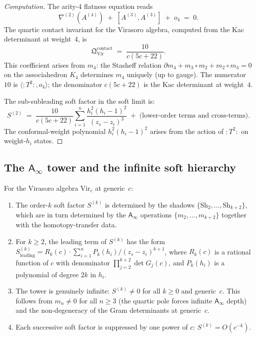 \documentclass[11pt]{article}
\newcommand{\Ainf}{\mathsf{A}_{\infty}}
\begin{document}
\begin{proof}[Computation]
The arity-$4$ flatness equation reads
\[
\nabla^{(2)}(A^{(4)})
\;+\;
[A^{(3)}, A^{(3)}]
\;+\; o_4
\;=\; 0.
\]
The quartic contact invariant for the Virasoro algebra, computed from the Kac determinant at weight~$4$, is
\begin{equation}\label{eq:quartic-from-m4}
\mathfrak{Q}^{\mathrm{contact}}_{\mathrm{Vir}}
\;=\;
\frac{10}{c(5c + 22)}.
\end{equation}
This coefficient arises from $m_4$: the Stasheff relation $\partial m_4 + m_3 \circ m_2 + m_2 \circ m_3 = 0$ on the associahedron $K_4$ determines $m_4$ uniquely (up to gauge).  The numerator~$10$ is $\langle :T^2:, o_4 \rangle$; the denominator $c(5c+22)$ is the Kac determinant at weight~$4$.

The sub-subleading soft factor in the soft limit is:
\begin{equation}\label{eq:sub-subleading-from-m4}
\boxed{
S^{(2)}
\;=\;
\frac{10}{c(5c+22)}
\sum_{i=1}^{n}
\frac{h_i^2(h_i - 1)^2}{(z_s - z_i)^3}
\;+\; \text{(lower-order terms and cross-terms)}.}
\end{equation}
The conformal-weight polynomial $h_i^2(h_i - 1)^2$ arises from the action of $:T^2:$ on weight-$h_i$ states.
\end{proof}

\subsection{The $\Ainf$ tower and the infinite soft hierarchy}

\begin{proposition}[$\Ainf$ tower $\Longleftrightarrow$ soft graviton tower]\label{claim:ainf-soft-tower}
For the Virasoro algebra $\mathrm{Vir}_c$ at generic~$c$:
\begin{enumerate}
\item[(a)] The order-$k$ soft factor $S^{(k)}$ is determined by the shadows $\{\mathrm{Sh}_2, \ldots, \mathrm{Sh}_{k+2}\}$, which are in turn determined by the $\Ainf$ operations $\{m_2, \ldots, m_{k+2}\}$ together with the homotopy-transfer data.
\item[(b)] For $k \ge 2$, the leading term of $S^{(k)}$ has the form
  $S^{(k)}_{\mathrm{leading}} = R_k(c) \cdot \sum_{i=1}^n P_k(h_i)/(z_s - z_i)^{k+1}$,
  where $R_k(c)$ is a rational function of $c$ with denominator $\prod_{j=2}^{k+2} \det G_j(c)$, and $P_k(h_i)$ is a polynomial of degree $2k$ in $h_i$.
\item[(c)] The tower is genuinely infinite: $S^{(k)} \ne 0$ for all $k \ge 0$ and generic~$c$.  This follows from $m_n \ne 0$ for all $n \ge 3$ (the quartic pole forces infinite $\Ainf$ depth) and the non-degeneracy of the Gram determinants at generic~$c$.
\item[(d)] Each successive soft factor is suppressed by one power of $c$: $S^{(k)} = O(c^{-k})$.
\end{enumerate}
\end{proposition}
\end{document}
